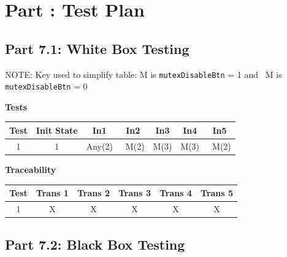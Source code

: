 \documentclass{article}
\newcounter{partNum}
\newcommand{\partNum}{%
        \stepcounter{partNum}%
        \thepartNum}
\newcommand{\sectPart}[1]{\section*{Part \partNum: #1}}
\begin{document}

\sectPart{Test Plan}

\subsection*{Part 7.1: White Box Testing}

NOTE: Key used to simplify table: M is \texttt{mutexDisableBtn} = 1 and ~M is \texttt{mutexDisableBtn} = 0

\vspace*{2em}

\begin{center}
    \textbf{Tests}\\
    \vspace{0.5em}
    \begin{tabular}{| c | c | c | c | c | c | c |}
        \hline
        Test & Init State & In1 & In2 & In3 & In4 & In5 \\ \hline
        1 & 1 & Any(2) & ~M(2) & M(3) & M(3) & ~M(2) \\ \hline
    \end{tabular}
\end{center}

\vspace*{2em}

\begin{center}
    \textbf{Traceability} \\
    \vspace{0.5em}
    \begin{tabular}{| c | c | c | c | c | c |}
        \hline
        Test & Trans 1 & Trans 2 & Trans 3 & Trans 4 & Trans 5 \\ \hline
        1 & X & X & X & X & X \\ \hline
    \end{tabular}
\end{center}

\newpage

\subsection*{Part 7.2: Black Box Testing}
\end{document}

